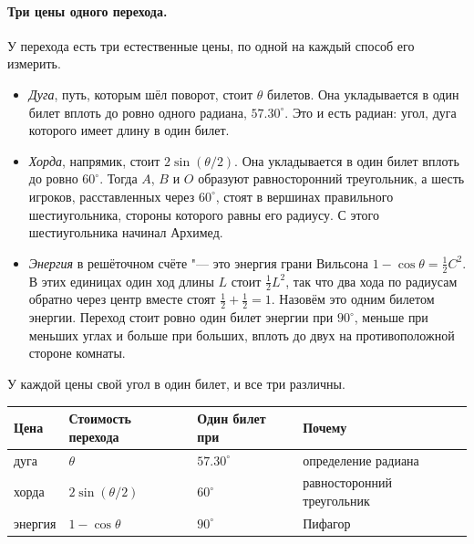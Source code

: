 \paragraph{Три цены одного перехода.} У перехода есть три естественные цены, по одной
на каждый способ его измерить.
\begin{itemize}
  \item \emph{Дуга}, путь, которым шёл поворот, стоит $\theta$ билетов. Она укладывается в один билет
    вплоть до ровно одного радиана, $57.30^\circ$. Это и есть радиан: угол, дуга которого
    имеет длину в один билет.
  \item \emph{Хорда}, напрямик, стоит $2\sin(\theta/2)$. Она укладывается в один билет вплоть
    до ровно $60^\circ$. Тогда $A$, $B$ и $O$ образуют равносторонний треугольник, а шесть
    игроков, расставленных через $60^\circ$, стоят в вершинах правильного шестиугольника, стороны которого
    равны его радиусу. С этого шестиугольника начинал Архимед.
  \item \emph{Энергия} в решёточном счёте "--- это энергия грани Вильсона
    $1-\cos\theta=\tfrac12C^2$. В этих единицах один ход длины $L$ стоит
    $\tfrac12L^2$, так что два хода по радиусам обратно через центр вместе стоят
    $\tfrac12+\tfrac12=1$. Назовём это одним билетом энергии. Переход стоит
    ровно один билет энергии при $90^\circ$, меньше при меньших углах и больше при больших, вплоть до двух на
    противоположной стороне комнаты.
\end{itemize}
У каждой цены свой угол в один билет, и все три различны.
\begin{center}\small
\begin{tabular}{llll}\toprule
Цена & Стоимость перехода & Один билет при & Почему \\ \midrule
дуга & $\theta$ & $57.30^\circ$ & определение радиана \\
хорда & $2\sin(\theta/2)$ & $60^\circ$ & равносторонний треугольник \\
энергия & $1-\cos\theta$ & $90^\circ$ & Пифагор \\
\bottomrule\end{tabular}
\end{center}

